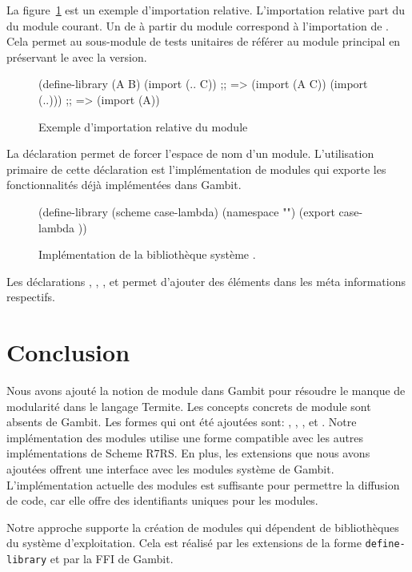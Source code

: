 La figure~\ref{fig:relative-import} est un exemple d'importation relative.
L'importation relative part du  du module courant.  Un
 de  à partir du module 
correspond à l'importation de . Cela permet au sous-module de
tests unitaires de référer au module principal en préservant le
 avec la version. \\

\begin{figure}[ht]
  \centering
  \begin{mplisting}{0.8}
(define-library (A B)
  (import (.. C))  ;; => (import (A C))
  (import (..))) ;; => (import (A))
\end{mplisting}
  \caption{Exemple d'importation relative du module}
  \label{fig:relative-import}
\end{figure}

La déclaration  permet de forcer l'espace de nom d'un module.
L'utilisation primaire de cette déclaration est l'implémentation de modules qui
exporte les fonctionnalités déjà implémentées dans Gambit. \\

\begin{figure}[ht]
  \begin{mplisting}{0.8}
(define-library (scheme case-lambda)
  (namespace "")
  (export
case-lambda
))
\end{mplisting}
  \caption{Implémentation de la bibliothèque système .}
  \label{fig:module->scheme/case-lambda}
\end{figure}

Les déclarations , , ,
 et  permet d'ajouter des éléments dans les
méta informations respectifs.

\section{Conclusion}

Nous avons ajouté la notion de module dans Gambit pour résoudre le manque de
modularité dans le langage Termite.  Les concepts concrets de module sont absents
de Gambit. Les formes qui ont été ajoutées sont: ,
, ,  et
.  Notre implémentation des modules utilise une forme
compatible avec les autres implémentations de Scheme R7RS. En plus, les
extensions que nous avons ajoutées offrent une interface avec les modules
système de Gambit. L'implémentation actuelle des modules est suffisante pour
permettre la diffusion de code, car elle offre des identifiants uniques pour
les modules.

Notre approche supporte la création de modules qui dépendent de bibliothèques
du système d'exploitation.  Cela est réalisé par les extensions de la forme
\texttt{define-library} et par la FFI de Gambit.
